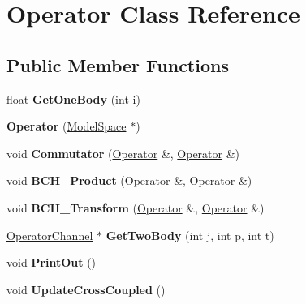 \hypertarget{classOperator}{\section{Operator Class Reference}
\label{classOperator}
}
\subsection*{Public Member Functions}
\begin{DoxyCompactItemize}
\item 
\hypertarget{classOperator_aff5e2daad15c8818b12cbe1a873e472d}{float {\bfseries Get\-One\-Body} (int i)}\label{classOperator_aff5e2daad15c8818b12cbe1a873e472d}

\item 
\hypertarget{classOperator_ada400ee3891ab72b2550840c6414dc2f}{{\bfseries Operator} (\hyperlink{classModelSpace}{Model\-Space} $\ast$)}\label{classOperator_ada400ee3891ab72b2550840c6414dc2f}

\item 
\hypertarget{classOperator_affa063364d74d27df82c0b7337652edb}{void {\bfseries Commutator} (\hyperlink{classOperator}{Operator} \&, \hyperlink{classOperator}{Operator} \&)}\label{classOperator_affa063364d74d27df82c0b7337652edb}

\item 
\hypertarget{classOperator_a105ee195fcae8c3b5a77dea8c0949cd3}{void {\bfseries B\-C\-H\-\_\-\-Product} (\hyperlink{classOperator}{Operator} \&, \hyperlink{classOperator}{Operator} \&)}\label{classOperator_a105ee195fcae8c3b5a77dea8c0949cd3}

\item 
\hypertarget{classOperator_a7013c10ccf897eefbfddf05af9fb86dd}{void {\bfseries B\-C\-H\-\_\-\-Transform} (\hyperlink{classOperator}{Operator} \&, \hyperlink{classOperator}{Operator} \&)}\label{classOperator_a7013c10ccf897eefbfddf05af9fb86dd}

\item 
\hypertarget{classOperator_af9d90879a89b3cdf619295f794ebb5f1}{\hyperlink{classOperatorChannel}{Operator\-Channel} $\ast$ {\bfseries Get\-Two\-Body} (int j, int p, int t)}\label{classOperator_af9d90879a89b3cdf619295f794ebb5f1}

\item 
\hypertarget{classOperator_a0c8733771511fcc08cdbd3ecd70219e5}{void {\bfseries Print\-Out} ()}\label{classOperator_a0c8733771511fcc08cdbd3ecd70219e5}

\item 
\hypertarget{classOperator_a3fe9d7a90ee56f01874933ba605094a4}{void {\bfseries Update\-Cross\-Coupled} ()}\label{classOperator_a3fe9d7a90ee56f01874933ba605094a4}


\end{DoxyCompactItemize}
